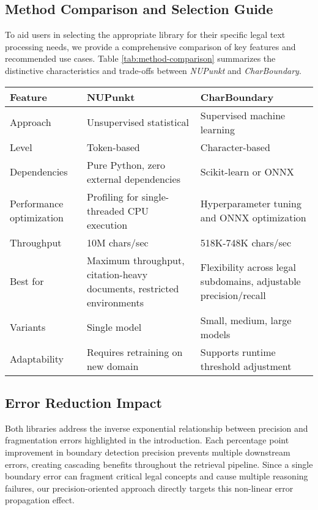 \subsection{Method Comparison and Selection Guide}
To aid users in selecting the appropriate library for their specific legal text processing needs, we provide a comprehensive comparison of key features and recommended use cases. Table \ref{tab:method-comparison} summarizes the distinctive characteristics and trade-offs between \textit{NUPunkt} and \textit{CharBoundary}.

\begin{table*}[htbp!]
\centering
\small
\begin{tabular}{p{2.2cm}|p{6.3cm}|p{6.3cm}}
\hline
\textbf{Feature} & \textbf{NUPunkt} & \textbf{CharBoundary} \\
\hline
Approach & Unsupervised statistical & Supervised machine learning \\
\hline
Level & Token-based & Character-based \\
\hline
Dependencies & Pure Python, zero external dependencies & Scikit-learn or ONNX \\
\hline
Performance optimization & Profiling for single-threaded CPU execution & Hyperparameter tuning and ONNX optimization \\
\hline
Throughput & 10M chars/sec & 518K-748K chars/sec \\
\hline
Best for & Maximum throughput, citation-heavy documents, restricted environments & Flexibility across legal subdomains, adjustable precision/recall \\
\hline
Variants & Single model & Small, medium, large models \\
\hline
Adaptability & Requires retraining on new domain & Supports runtime threshold adjustment \\
\hline
\end{tabular}
\caption{Comparison of NUPunkt and CharBoundary features and use cases}
\label{tab:method-comparison}
\end{table*}

\subsection{Error Reduction Impact}
Both libraries address the inverse exponential relationship between precision and fragmentation errors highlighted in the introduction. Each percentage point improvement in boundary detection precision prevents multiple downstream errors, creating cascading benefits throughout the retrieval pipeline. Since a single boundary error can fragment critical legal concepts and cause multiple reasoning failures, our precision-oriented approach directly targets this non-linear error propagation effect.

